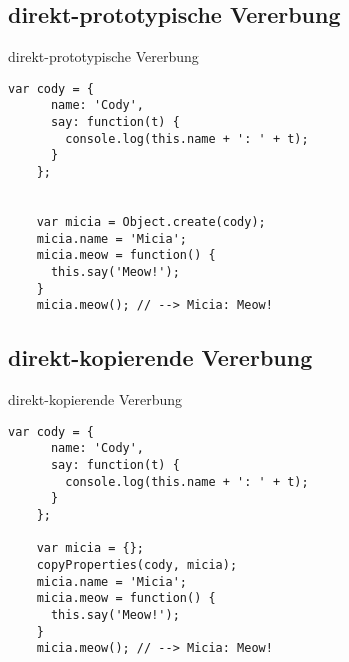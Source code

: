 
\subsection{direkt-prototypische Vererbung}

\begin{frame}[fragile]{direkt-prototypische Vererbung}
  \begin{lstlisting}[gobble=4]
    var cody = {
      name: 'Cody',
      say: function(t) {
        console.log(this.name + ': ' + t);
      }
    };
    
    
    var micia = Object.create(cody);
    micia.name = 'Micia';
    micia.meow = function() {
      this.say('Meow!');
    }
    micia.meow(); // --> Micia: Meow!
  \end{lstlisting}
\end{frame}

\subsection{direkt-kopierende Vererbung}

\begin{frame}[fragile]{direkt-kopierende Vererbung}
  \begin{lstlisting}[gobble=4]
    var cody = {
      name: 'Cody',
      say: function(t) {
        console.log(this.name + ': ' + t);
      }
    };
      
    var micia = {};
    copyProperties(cody, micia);
    micia.name = 'Micia';
    micia.meow = function() {
      this.say('Meow!');
    }
    micia.meow(); // --> Micia: Meow!
  \end{lstlisting}
\end{frame}

